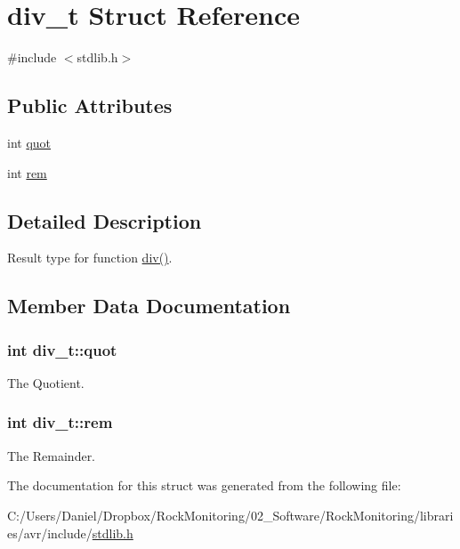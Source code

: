 \hypertarget{structdiv__t}{}\section{div\+\_\+t Struct Reference}
\label{structdiv__t}


{\ttfamily \#include $<$stdlib.\+h$>$}

\subsection*{Public Attributes}
\begin{DoxyCompactItemize}
\item 
int \hyperlink{structdiv__t_a0b9dda2884048daa68ca4aaa12b17b9a}{quot}
\item 
int \hyperlink{structdiv__t_ac64389de252de53eda8b4f8dbb7c623f}{rem}
\end{DoxyCompactItemize}


\subsection{Detailed Description}
Result type for function \hyperlink{group__avr__stdlib_ga63314983c7ee996c09f9e521eda5d399}{div()}. 

\subsection{Member Data Documentation}
\subsubsection[{\texorpdfstring{quot}{quot}}]{\setlength{\rightskip}{0pt plus 5cm}int div\+\_\+t\+::quot}\hypertarget{structdiv__t_a0b9dda2884048daa68ca4aaa12b17b9a}{}\label{structdiv__t_a0b9dda2884048daa68ca4aaa12b17b9a}
The Quotient. 
\subsubsection[{\texorpdfstring{rem}{rem}}]{\setlength{\rightskip}{0pt plus 5cm}int div\+\_\+t\+::rem}\hypertarget{structdiv__t_ac64389de252de53eda8b4f8dbb7c623f}{}\label{structdiv__t_ac64389de252de53eda8b4f8dbb7c623f}
The Remainder. 

The documentation for this struct was generated from the following file\+:\begin{DoxyCompactItemize}
\item 
C\+:/\+Users/\+Daniel/\+Dropbox/\+Rock\+Monitoring/02\+\_\+\+Software/\+Rock\+Monitoring/libraries/avr/include/\hyperlink{stdlib_8h}{stdlib.\+h}\end{DoxyCompactItemize}
